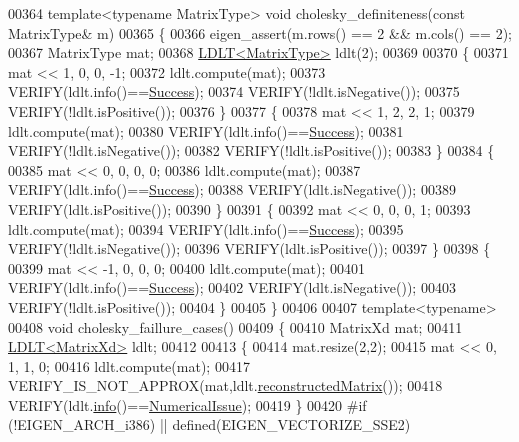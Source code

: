 \begin{DoxyCode}
00364 \textcolor{keyword}{template}<\textcolor{keyword}{typename} MatrixType> \textcolor{keywordtype}{void} cholesky\_definiteness(\textcolor{keyword}{const} MatrixType& m)
00365 \{
00366   eigen\_assert(m.rows() == 2 && m.cols() == 2);
00367   MatrixType mat;
00368   \hyperlink{group___cholesky___module_class_eigen_1_1_l_d_l_t}{LDLT<MatrixType>} ldlt(2);
00369 
00370   \{
00371     mat << 1, 0, 0, -1;
00372     ldlt.compute(mat);
00373     VERIFY(ldlt.info()==\hyperlink{group__enums_gga85fad7b87587764e5cf6b513a9e0ee5ea52581b035f4b59c203b8ff999ef5fcea}{Success});
00374     VERIFY(!ldlt.isNegative());
00375     VERIFY(!ldlt.isPositive());
00376   \}
00377   \{
00378     mat << 1, 2, 2, 1;
00379     ldlt.compute(mat);
00380     VERIFY(ldlt.info()==\hyperlink{group__enums_gga85fad7b87587764e5cf6b513a9e0ee5ea52581b035f4b59c203b8ff999ef5fcea}{Success});
00381     VERIFY(!ldlt.isNegative());
00382     VERIFY(!ldlt.isPositive());
00383   \}
00384   \{
00385     mat << 0, 0, 0, 0;
00386     ldlt.compute(mat);
00387     VERIFY(ldlt.info()==\hyperlink{group__enums_gga85fad7b87587764e5cf6b513a9e0ee5ea52581b035f4b59c203b8ff999ef5fcea}{Success});
00388     VERIFY(ldlt.isNegative());
00389     VERIFY(ldlt.isPositive());
00390   \}
00391   \{
00392     mat << 0, 0, 0, 1;
00393     ldlt.compute(mat);
00394     VERIFY(ldlt.info()==\hyperlink{group__enums_gga85fad7b87587764e5cf6b513a9e0ee5ea52581b035f4b59c203b8ff999ef5fcea}{Success});
00395     VERIFY(!ldlt.isNegative());
00396     VERIFY(ldlt.isPositive());
00397   \}
00398   \{
00399     mat << -1, 0, 0, 0;
00400     ldlt.compute(mat);
00401     VERIFY(ldlt.info()==\hyperlink{group__enums_gga85fad7b87587764e5cf6b513a9e0ee5ea52581b035f4b59c203b8ff999ef5fcea}{Success});
00402     VERIFY(ldlt.isNegative());
00403     VERIFY(!ldlt.isPositive());
00404   \}
00405 \}
00406 
00407 \textcolor{keyword}{template}<\textcolor{keyword}{typename}>
00408 \textcolor{keywordtype}{void} cholesky\_faillure\_cases()
00409 \{
00410   MatrixXd mat;
00411   \hyperlink{group___cholesky___module_class_eigen_1_1_l_d_l_t}{LDLT<MatrixXd>} ldlt;
00412 
00413   \{
00414     mat.resize(2,2);
00415     mat << 0, 1, 1, 0;
00416     ldlt.compute(mat);
00417     VERIFY\_IS\_NOT\_APPROX(mat,ldlt.\hyperlink{group___cholesky___module_ae3693372ca29f50d87d324dfadaae148}{reconstructedMatrix}());
00418     VERIFY(ldlt.\hyperlink{group___cholesky___module_a6bd6008501a537d2e16ea672a853bf3e}{info}()==\hyperlink{group__enums_gga85fad7b87587764e5cf6b513a9e0ee5eaaf9b736d310a664e7729d163a035cc5f}{NumericalIssue});
00419   \}
00420 \textcolor{preprocessor}{#if (!EIGEN\_ARCH\_i386) || defined(EIGEN\_VECTORIZE\_SSE2)}

\end{DoxyCode}
